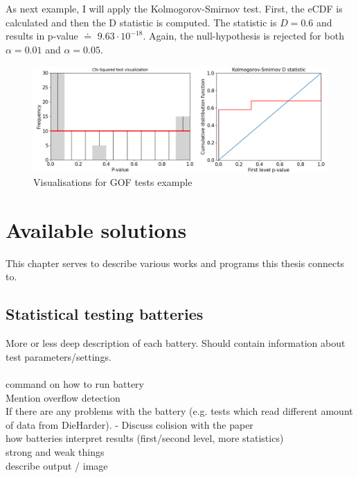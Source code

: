 \documentclass[
  digital,     %
  oneside,     %
  nosansbold,  %
  nocolorbold, %
  nolof,         %
  nolot,         %
]{fithesis4}
\begin{document}
As next example, I will apply the Kolmogorov-Smirnov test. First, the eCDF is calculated and then the D statistic is computed. The statistic is $D = 0.6$ and results in p-value $\doteq$ $9.63\cdot10^{-18}$. Again, the null-hypothesis is rejected for both $\alpha = 0.01$ and $\alpha = 0.05$. 


\begin{figure}
  \begin{center}
    \includegraphics[width=13cm]{figures/two_example.png}
  \end{center}
  \caption{Visualisations for GOF tests example}
  \label{fig:two_example}
\end{figure}


\chapter{Available solutions}


This chapter serves to describe various works and programs this thesis connects to. \\


\section{Statistical testing batteries}
More or less deep description of each battery. Should contain information about test parameters/settings.\\
\\
command on how to run battery\\
Mention overflow detection\\
If there are any problems with the battery (e.g. tests which read different amount of data from DieHarder). - Discuss colision with the paper\\

how batteries interpret results (first/second level, more statistics)\\
strong and weak things \\
describe output / image\\
\end{document}
